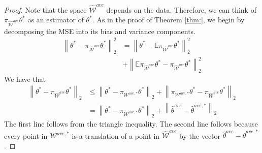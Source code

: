 \documentclass[twoside]{article}
\DeclareMathOperator*{\vecspan}{span}
\newcommand{\Wave}{{\mathcal{\hat W}^{ave}}}
\newcommand{\Wtave}{{\mathcal{W}^{ave,*}}}
\newcommand{\E}{\mathbb{E}}
\newcommand{\w}{\theta}
\newcommand{\wave}{\hat\w^{ave}}
\newcommand{\wtave}{\hat\w^{ave,*}}
\newcommand{\wmle}{\hat\w^{mle}}
\newcommand{\wstar}{{\w^{*}}}
\newcommand{\ltwo}[1]{{\left\lVert {#1} \right\rVert}_2}
\newcommand{\proj}[1]{\pi_{{#1}}}
\begin{document}
\begin{proof}
Note that the space $\Wave$ depends on the data.
Therefore, we can think of $\proj\Wave\wstar$ as an estimator of $\wstar$.
As in the proof of Theorem \ref{thm:},
we begin by decomposing the MSE into its bias and variance components.
\begin{equation}
\begin{split}
\ltwo{\wstar-\proj\Wave\wstar}^2
&=
\ltwo{\wstar-\E\proj\Wave\wstar}^2
\\&+
\ltwo{\E\proj\Wave\wstar-\proj\Wave\wstar}^2
\end{split}
\end{equation}
We have that
\begin{align}
\ltwo{\wstar-\proj\Wave\wstar}
&\le
\ltwo{\wstar-\proj\Wtave\wstar}
+
\ltwo{\proj\Wtave\wstar-\proj\Wave\wstar}
\\
&=
\ltwo{\wstar-\proj\Wtave\wstar}
+
\ltwo{\wave-\wtave}
\label{eq:errdecomp}
\end{align}
The first line follows from the triangle inequality.
The second line follows because every point in $\Wtave$ is a translation of a point in $\Wave$ by the vector $\wave-\wtave$.


\end{proof}
\end{document}
